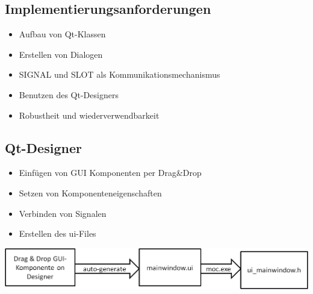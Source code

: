 \documentclass{beamer}
\begin{document}
\subsection{Implementierungsanforderungen}
	\begin{frame}
		\centering
		\begin{large}
			\begin{itemize}
				\item 	Aufbau von Qt-Klassen\\
                \vspace{1em}
				\item Erstellen von Dialogen\\
                \vspace{1em}
				\item SIGNAL und SLOT als Kommunikationsmechanismus\\
                \vspace{1em}
				\item Benutzen des Qt-Designers\\
                \vspace{1em}
				\item Robustheit und wiederverwendbarkeit
			\end{itemize}
		\end{large}
	\end{frame}
	
\subsection{Qt-Designer}
	\begin{frame}
		\centering
		\begin{large}
			\begin{itemize}
				\item 	Einfügen von GUI Komponenten per Drag\&Drop\\
                \vspace{1em}
				\item Setzen von Komponenteneigenschaften\\
                \vspace{1em}
				\item Verbinden von Signalen\\
                \vspace{1em}
				\item Erstellen des ui-Files   \\
			\end{itemize}
		\end{large}
		\vspace{3em}
		\includegraphics[width=\textwidth]{designer.png}
	\end{frame}
	
\end{document}

